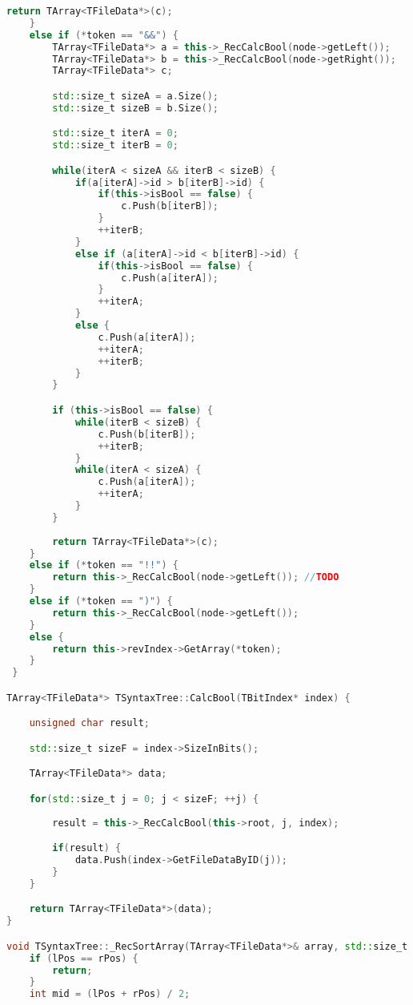 \begin{lstlisting}[language=C++]
        return TArray<TFileData*>(c);
    }
    else if (*token == "&&") {
        TArray<TFileData*> a = this->_RecCalcBool(node->getLeft());
        TArray<TFileData*> b = this->_RecCalcBool(node->getRight());
        TArray<TFileData*> c;

        std::size_t sizeA = a.Size();
        std::size_t sizeB = b.Size();

        std::size_t iterA = 0;
        std::size_t iterB = 0;

        while(iterA < sizeA && iterB < sizeB) {
            if(a[iterA]->id > b[iterB]->id) {
                if(this->isBool == false) {
                    c.Push(b[iterB]);
                }
                ++iterB;
            }
            else if (a[iterA]->id < b[iterB]->id) {
                if(this->isBool == false) {
                    c.Push(a[iterA]);
                }
                ++iterA;
            }
            else {
                c.Push(a[iterA]);
                ++iterA;
                ++iterB;
            }
        }

        if (this->isBool == false) {
            while(iterB < sizeB) {
                c.Push(b[iterB]);
                ++iterB;
            }
            while(iterA < sizeA) {
                c.Push(a[iterA]);
                ++iterA;
            }
        }
        
        return TArray<TFileData*>(c);
    }
    else if (*token == "!!") {
        return this->_RecCalcBool(node->getLeft()); //TODO
    }
    else if (*token == ")") {
        return this->_RecCalcBool(node->getLeft());
    }
    else {
        return this->revIndex->GetArray(*token);
    }
 }

TArray<TFileData*> TSyntaxTree::CalcBool(TBitIndex* index) {

    unsigned char result;

    std::size_t sizeF = index->SizeInBits();

    TArray<TFileData*> data;

    for(std::size_t j = 0; j < sizeF; ++j) {
        
        result = this->_RecCalcBool(this->root, j, index);

        if(result) {
            data.Push(index->GetFileDataByID(j));
        }
    }

    return TArray<TFileData*>(data);
}

void TSyntaxTree::_RecSortArray(TArray<TFileData*>& array, std::size_t lPos, std::size_t rPos) {
    if (lPos == rPos) {
        return;
    }
    int mid = (lPos + rPos) / 2;


\end{lstlisting}
